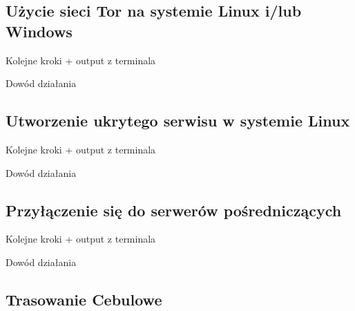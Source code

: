 \subsection{Użycie sieci Tor na systemie Linux i/lub Windows}
\begin{description}
 \item Kolejne kroki + output z terminala
 \item Dowód działania
\end{description}

\subsection{Utworzenie ukrytego serwisu w systemie Linux}
\begin{description}
 \item Kolejne kroki + output z terminala
 \item Dowód działania
\end{description}

\subsection{Przyłączenie się do serwerów pośredniczących}
\begin{description}
 \item Kolejne kroki + output z terminala
 \item Dowód działania
\end{description}

\subsection{Trasowanie Cebulowe}
